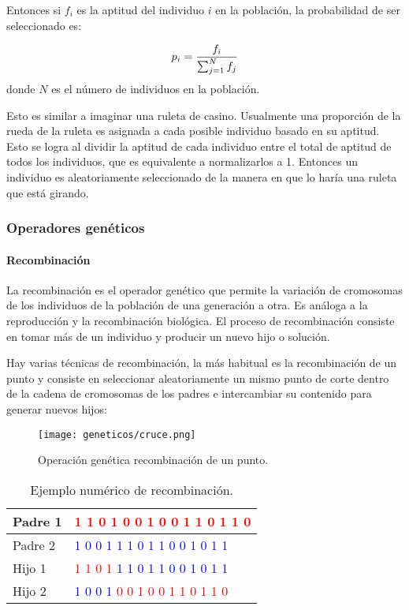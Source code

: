 Entonces si \(f_i\)  es la aptitud del individuo \(i\) en la población, la probabilidad de ser seleccionado es:\par
\[p_i = {f_i \over \sum_{j=1}^{N} f_j}\]
donde \(N\) es el número de individuos en la población.\par

Esto es similar a imaginar una ruleta de casino. Usualmente una proporción de la rueda de la ruleta es asignada a cada posible individuo basado en su aptitud. Esto se logra al dividir la aptitud de cada individuo entre el total de aptitud de todos los individuos, que es equivalente a normalizarlos a 1. Entonces un individuo es aleatoriamente seleccionado de la manera en que lo haría una ruleta que está girando.

\subsubsection{Operadores gen\'eticos}

\paragraph{Recombinaci\'on}

La recombinación es el operador genético que permite la variación de cromosomas de los individuos de la población de una generación a otra. Es análoga a la reproducción y la recombinación biológica. El proceso de recombinación consiste en tomar más de un individuo y producir un nuevo hijo o solución.\par

Hay varias técnicas de recombinación, la más habitual es la recombinación de un punto y consiste en seleccionar aleatoriamente un mismo punto de corte dentro de la cadena de cromosomas de los padres e intercambiar su contenido para generar nuevos hijos:

\begin{figure}[H]
  \centering
  \texttt{[image: geneticos/cruce.png]}
  \caption{Operación genética recombinación de un punto.}
\end{figure}

\begin{table}[H]
  \centering
  \begin{tabular}{|l|l|}
  \hline
  Padre 1 & \textcolor{red}{1 1 0 1 0 0 1 0 0 1 1 0 1 1 0}                    \\ \hline
  Padre 2 & \textcolor{blue}{1 0 0 1 1 1 0 1 1 0 0 1 0 1 1}                   \\ \hline
  Hijo 1  & \textcolor{red}{1 1 0 1} \textcolor{blue}{ 1 1 0 1 1 0 0 1 0 1 1} \\ \hline
  Hijo 2  & \textcolor{blue}{1 0 0 1} \textcolor{red}{0 0 1 0 0 1 1 0 1 1 0}  \\ \hline
  \end{tabular}
  \caption{Ejemplo numérico de recombinación.}
\end{table}

